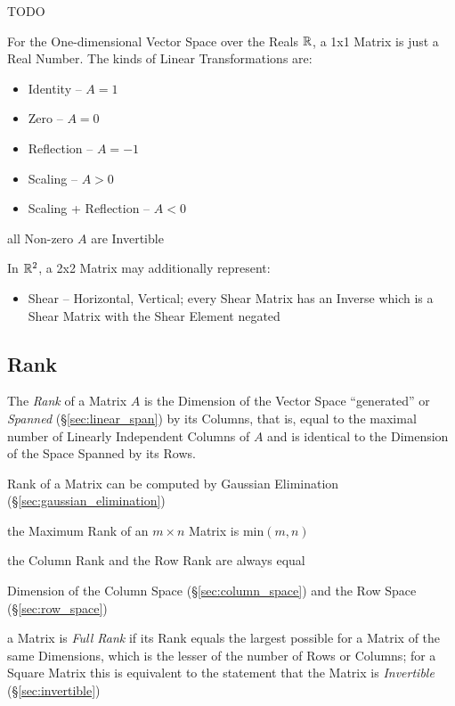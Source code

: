 \asterism

TODO

For the One-dimensional Vector Space over the Reals $\mathbb{R}$, a 1x1 Matrix is
just a Real Number. The kinds of Linear Transformations are:
\begin{itemize}
  \item Identity -- $A = 1$
  \item Zero -- $A = 0$
  \item Reflection -- $A = -1$
  \item Scaling -- $A > 0$
  \item Scaling + Reflection -- $A < 0$
\end{itemize}
all Non-zero $A$ are Invertible

In $\mathbb{R}^2$, a 2x2 Matrix may additionally represent:
\begin{itemize}
  \item Shear -- Horizontal, Vertical; every Shear Matrix has an Inverse which
    is a Shear Matrix with the Shear Element negated
\end{itemize}



\subsection{Rank}\label{sec:rank}

The \emph{Rank} of a Matrix $A$ is the Dimension of the Vector Space
``generated'' or \emph{Spanned} (\S\ref{sec:linear_span}) by its Columns, that
is, equal to the maximal number of Linearly Independent Columns of $A$ and is
identical to the Dimension of the Space Spanned by its Rows.

\fist Rank of a Matrix can be computed by Gaussian Elimination
(\S\ref{sec:gaussian_elimination})

the Maximum Rank of an $m \times n$ Matrix is $\mathrm{min}(m,n)$

the Column Rank and the Row Rank are always equal

Dimension of the Column Space (\S\ref{sec:column_space}) and the Row Space
(\S\ref{sec:row_space})

a Matrix is \emph{Full Rank} if its Rank equals the largest possible for a
Matrix of the same Dimensions, which is the lesser of the number of Rows or
Columns; for a Square Matrix this is equivalent to the statement that the
Matrix is \emph{Invertible} (\S\ref{sec:invertible})

